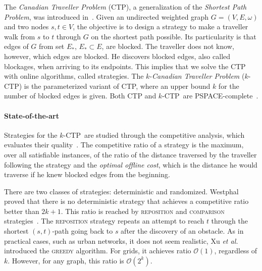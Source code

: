 \documentclass[preprint]{elsarticle}
\newcommand{\kctp}{$k$-CTP}
\newcommand{\stpath}{$(s,t)$-path}
\begin{document}
The \textit{Canadian Traveller Problem} (CTP), a generalization of the \textit{Shortest Path Problem}, was introduced in~\cite{PaYa91}. Given an undirected weighted graph $G=(V,E,\omega)$ and two nodes $s,t \in V$, the objective is to design a strategy to make a traveller walk from $s$ to $t$ through $G$ on the shortest path possible. Its particularity is that edges of $G$ from set $E_*$, $E_* \subset E$, are blocked. The traveller does not know, however, which edges are blocked. He discovers blocked edges, also called blockages, when arriving to its endpoints. This implies that we solve the CTP with online algorithms, called strategies. The $k$-\textit{Canadian Traveller Problem} (\kctp) is the parameterized variant of CTP, where an upper bound $k$ for the number of blocked edges is given. Both CTP and \kctp ~are PSPACE-complete~\cite{BaSc91,PaYa91}.

\paragraph{State-of-the-art}
Strategies for the \kctp ~are studied through the competitive analysis, which evaluates their quality~\cite{BoEl98}. The competitive ratio of a strategy is the maximum, over all satisfiable instances, of the ratio of the distance traversed by the traveller following the strategy and the \textit{optimal offline cost}, which is the distance he would traverse if he knew blocked edges from the beginning. 

There are two classes of strategies: deterministic and randomized. Westphal~\cite{We08} proved that there is no deterministic strategy that achieves a competitive ratio better than $2k+1$. This ratio is reached by \textsc{reposition} and \textsc{comparison} strategies~\cite{We08,XuHuSuZh09}. The \textsc{reposition} strategy repeats an attempt to reach $t$ through the shortest \stpath{} going back to $s$ after the discovery of an obstacle. As in practical cases, such as urban networks, it does not seem realistic, Xu {\em et al.\/}~\cite{XuHuSuZh09} introduced the \textsc{greedy} algorithm. For grids, it achieves ratio $\mathcal{O}\left(1\right)$, regardless of $k$. However, for any graph, this ratio is $\mathcal{O}\left(2^k\right)$.
\end{document}
